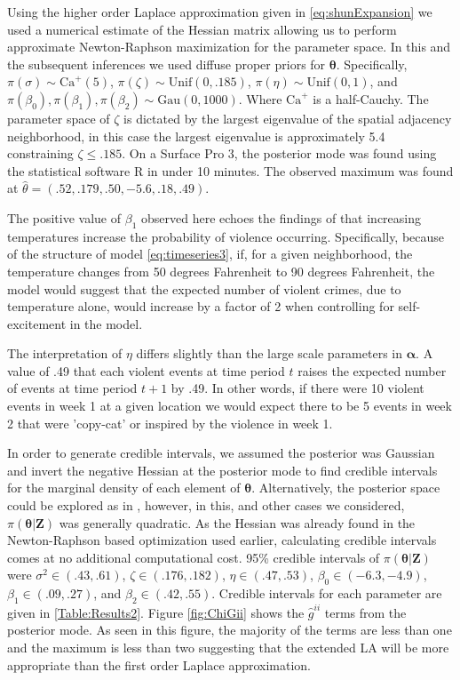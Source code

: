 \documentclass[11pt]{isuthesis}
\begin{document}
	Using the higher order Laplace approximation given in \eqref{eq:shunExpansion} we used a numerical estimate of the Hessian matrix allowing us to perform approximate Newton-Raphson maximization for the parameter space.  In this and the subsequent inferences we used diffuse proper priors for $\boldsymbol{\theta}$.  Specifically, $\pi(\sigma)\sim \text{Ca}^{+}(5)$, $\pi(\zeta) \sim \text{Unif}(0,.185)$, $\pi(\eta)\sim \text{Unif}(0,1)$, and $\pi(\beta_0),\pi(\beta_1),\pi(\beta_2) \sim \text{Gau} (0,1000)$.  Where $\text{Ca}^+$ is a half-Cauchy.  The parameter space of $\zeta$ is dictated by the largest eigenvalue of the spatial adjacency neighborhood, in this case the largest eigenvalue is approximately 5.4 constraining $\zeta \leq .185$.  On a Surface Pro 3, the posterior mode was found using the statistical software R in under 10 minutes.  The observed maximum was found at $\hat{\theta}=(.52,.179,.50,-5.6,.18,.49)$.  
	
	The positive value of $\beta_1$ observed here echoes the findings of \cite{anderson1987temperature} that increasing temperatures increase the probability of violence occurring.  Specifically, because of the structure of model \eqref{eq:timeseries3}, 
	if, for a given neighborhood, the temperature changes from 50 degrees Fahrenheit to 90 degrees Fahrenheit, the model would suggest that the expected number of violent crimes, due to temperature alone, would increase by a factor of 2 when controlling for self-excitement in the model.  
	
	The interpretation of $\eta$ differs slightly than the large scale parameters in $\boldsymbol{\alpha}$.  A value of .49 that each violent events at time period $t$ raises the expected number of events at time period $t+1$ by .49.  In other words, if there were 10 violent events in week 1 at a given location we would expect there to be 5 events in week 2 that were 'copy-cat' or inspired by the violence in week 1.
	
	In order to generate credible intervals, we assumed the posterior was Gaussian and invert the negative Hessian at the posterior mode to find credible intervals for the marginal density of each element of $\boldsymbol{\theta}$.  Alternatively, the posterior space could be explored as in \cite{rue2009approximate}, however, in this, and other cases we considered, $\pi(\boldsymbol{\theta}|\boldsymbol{Z})$ was generally quadratic.  As the Hessian was already found in the Newton-Raphson based optimization used earlier, calculating credible intervals comes at no additional computational cost. 95\% credible intervals of $\pi(\boldsymbol{\theta}|\boldsymbol{Z})$ were $\sigma^2 \in (.43,.61)$, $\zeta \in (.176,.182)$, $\eta \in (.47,.53)$, $\beta_0 \in (-6.3,-4.9)$, $\beta_1 \in (.09,.27)$, and $\beta_2 \in (.42,.55)$.  Credible intervals for each parameter are given in \ref{Table:Results2}.  Figure \ref{fig:ChiGii} shows the $\hat{g}^{ii}$ terms from the posterior mode.  As seen in this figure, the majority of the terms are less than one and the maximum is less than two suggesting that the extended LA will be more appropriate than the first order Laplace approximation.
	
\end{document}
